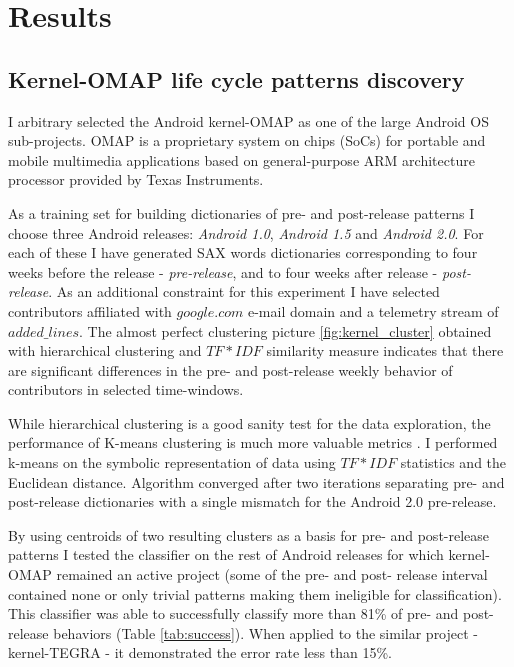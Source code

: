 \documentclass[10pt, conference, compsocconf]{IEEEtran}
\begin{document}
\section{Results}
\subsection{Kernel-OMAP life cycle patterns discovery}
I arbitrary selected the Android kernel-OMAP as one of the large Android OS sub-projects. 
OMAP is a proprietary system on chips (SoCs) for portable and mobile multimedia applications 
based on general-purpose ARM architecture processor provided by Texas Instruments.

As a training set for building dictionaries of pre- and post-release patterns I choose three Android releases:
\textit{Android 1.0}, \textit{Android 1.5} and \textit{Android 2.0}. For each of these I have generated
SAX words dictionaries corresponding to four weeks before the release - \textit{pre-release}, and to four 
weeks after release - \textit{post-release}.
As an additional constraint for this experiment I have selected contributors affiliated
with $google.com$ e-mail domain and a telemetry stream of $added\_lines$.
The almost perfect clustering picture \ref{fig:kernel_cluster} obtained with hierarchical clustering
and $TF\ast IDF$ similarity measure indicates that there are significant differences in the pre-
and post-release weekly behavior of contributors in selected time-windows.

While hierarchical clustering is a good sanity test for the data exploration, the performance of K-means 
clustering is much more valuable metrics \cite{citeulike:3562}. I performed k-means on the symbolic 
representation of data using $TF\ast IDF$ statistics and the Euclidean distance. Algorithm converged after two
iterations separating pre- and post-release dictionaries with a single mismatch for the Android 2.0 pre-release.

By using centroids of two resulting clusters as a basis for pre- and post-release patterns I tested 
the classifier on the rest of Android releases for which kernel-OMAP remained an active project
(some of the pre- and post- release interval contained none or only trivial patterns making them
ineligible for classification). This classifier was able to successfully classify more than 81\% 
of pre- and post-release behaviors (Table \ref{tab:success}). When applied to the similar project -
kernel-TEGRA - it demonstrated the error rate less than 15\%.
\end{document}
